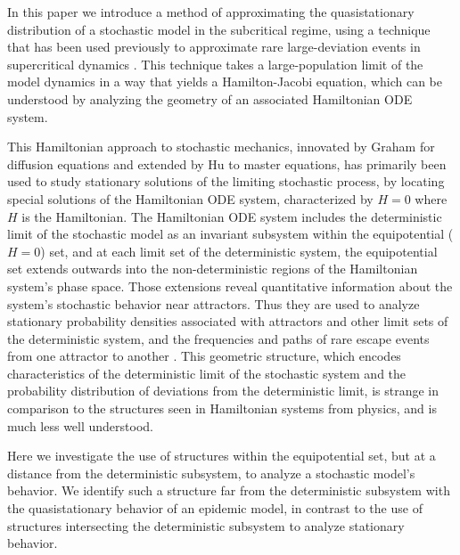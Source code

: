 \documentclass[review]{elsarticle}
\begin{document}
In this paper we introduce a method of approximating the
quasistationary distribution of a stochastic model in the subcritical regime,
using a technique that has been used previously 
to approximate rare large-deviation events in supercritical dynamics
\cite{dykman_disease_2008,ovaskainen_stochastic_2010,schwartz_converging_2011}. %
This technique takes a large-population limit of the model
dynamics in a way that yields a Hamilton-Jacobi equation,
which can be understood by analyzing the geometry of an
associated Hamiltonian ODE system.

This Hamiltonian approach to stochastic mechanics, innovated by Graham
\cite{graham_weak-noise_1984} for diffusion equations
and extended by Hu \cite{hu_stationary_1987} to master equations,
has primarily been used to study stationary solutions of the limiting
stochastic process, by locating special solutions of the Hamiltonian
ODE system, characterized by $H=0$ where $H$ is the Hamiltonian.
The Hamiltonian ODE system includes the
deterministic limit of the stochastic model as an invariant subsystem
within the equipotential ($H=0$) set,
and at each limit set of the deterministic system,
the equipotential set extends outwards into the non-deterministic
regions of the Hamiltonian system's phase space.
Those extensions reveal quantitative information about
the system's stochastic behavior near attractors.
Thus they are used to analyze stationary probability densities associated
with attractors and other limit sets of the deterministic system,
and the frequencies and paths of rare escape events from one attractor
to another
\cite{ovaskainen_stochastic_2010,black_wkb_2011,forgoston2011maximal,lindley_iterative_2013,lindley_rare-event_2014}.
This geometric structure, which encodes characteristics of the deterministic
limit of the stochastic system and the probability distribution of
deviations from the deterministic limit, is strange in comparison to
the structures seen in Hamiltonian systems from physics, and is
much less well understood.

Here we investigate the use of
structures within the equipotential set, but at a distance
from the deterministic subsystem, to analyze a stochastic model's behavior.
We identify such a structure far from the deterministic subsystem
with the quasistationary behavior of an epidemic model,
in contrast to the use of structures intersecting the deterministic subsystem
to analyze stationary behavior.
\end{document}
